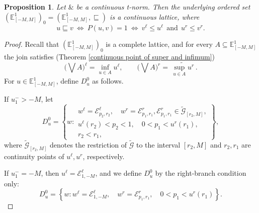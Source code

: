 \documentclass[preprint,3p,times]{elsarticle}
\theoremstyle{plain}
\newtheorem{prop}[thm]{Proposition}
\theoremstyle{definition}
\numberwithin{equation}{section}
\begin{document}
\begin{prop}\label{underlying order is continuous lattice}
Let $\&$ be a continuous t-norm. Then the underlying ordered set
$(\mathbb{E}^1_{[-M,M]})_0=(\mathbb{E}^1_{[-M,M]},\sqsubseteq)$ is a continuous
lattice, where
\[
u\sqsubseteq v\ \Longleftrightarrow\ P(u,v)=1
\ \Longleftrightarrow\ v^\ell\le u^\ell\ \ \text{and}\ \ u^r\le v^r.
\]
\end{prop}
\begin{proof}
Recall that $(\mathbb{E}^1_{[-M,M]})_0$ is a complete lattice, and for every
$A\subseteq\mathbb{E}^1_{[-M,M]}$ the join satisfies (Theorem
\ref{continuous point of super and infimum})
\[
\Big(\bigvee A\Big)^\ell=\inf_{u\in A}u^\ell,\qquad
\Big(\bigvee A\Big)^r=\widetilde{\,\sup_{u\in A}u^r\,}.
\]
For \(u\in\mathbb E^1_{[-M,M]}\), define \(D_u^0\) as follows.

If \(u_1^->-M\), let
\[
D_u^0=
\left\{
w:
\begin{array}{l}
w^\ell=\mathcal E^\ell_{p_2,r_2},\quad
w^r=\mathcal E^r_{p_1,r_1}, \mathcal E^r_{p_1,r_1}\in \tilde{\mathcal{G}}_{[r_2,M]},\\
u^\ell(r_2)<p_2<1,\quad
0< p_1<u^r(r_1),\\
r_2<r_1,
\end{array}
\right\},
\]
where \(\tilde{\mathcal{G}}_{[r_2,M]}\) denotes the restriction of \(\tilde{\mathcal{G}}\) to the interval \([r_2,M]\) and  \(r_2,r_1\) are continuity points of \(u^\ell,u^r\),
respectively.

If \(u_1^-=-M\), then \(u^\ell=\mathcal E^\ell_{1,-M}\), and we
define \(D_u^0\) by the right-branch condition only:
\[
D_u^0=
\left\{
w:
w^\ell=\mathcal E^\ell_{1,-M},\quad
w^r=\mathcal E^r_{p_1,r_1},\quad
0< p_1<u^r(r_1)
\right\}.
\]


\end{proof}
\end{document}
